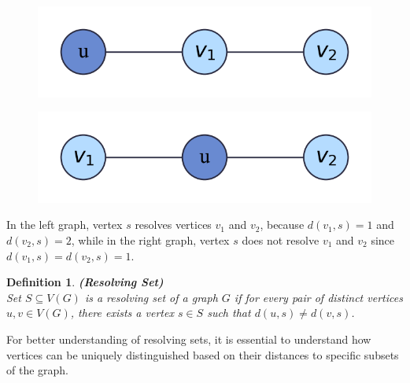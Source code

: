 \documentclass[12pt]{amsart}
\theoremstyle{plain}
\newtheorem*{definition}{Definition}
\begin{document}
\begin{figure}[h!]
  \centering
  \begin{minipage}{0.42\textwidth}
    \centering
    \includegraphics[width=\textwidth]{../figures/res_vertex_fig1.png}
    \label{fig:res_vertex_fig1}
  \end{minipage}
  \hspace{0.08\textwidth}
  \begin{minipage}{0.42\textwidth}
    \centering
    \includegraphics[width=\textwidth]{../figures/res_vertex_fig2.png}
    \label{fig:res_vertex_fig2}
  \end{minipage}
\end{figure}

\vspace{-0.5cm}

In the left graph, vertex $s$ resolves vertices $v_1$ and $v_2$, because $d(v_1, s) = 1$ and $d(v_2, s) = 2$, while in the right graph, vertex $s$ does not resolve $v_1$ and $v_2$ since $d(v_1, s) = d(v_2, s) = 1$.

\vspace{-0.2cm}

\begin{definition} \textbf{(Resolving Set)} \\[1pt]
  Set $S \subseteq V(G)$ is a \textit{resolving set} of a graph $G$ if for every pair of distinct vertices $u, v \in V(G)$, there exists a vertex $s \in S$ such that $d(u, s) \neq d(v, s)$.
\end{definition}

\vspace{-0.2cm}

For better understanding of resolving sets, it is essential to understand how vertices can be uniquely distinguished based on their distances to specific subsets of the graph.
\end{document}
